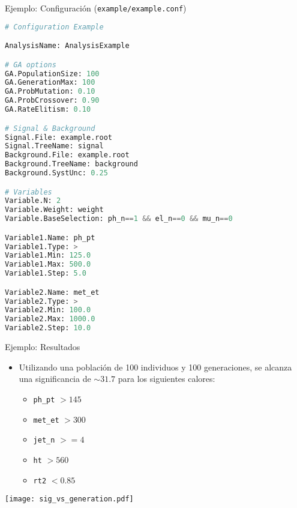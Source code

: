 \documentclass[center,10pt,cm]{beamer}
\begin{document}
\begin{frame}[fragile]{Ejemplo: Configuraci\'on (\texttt{example/example.conf})}

  \tiny
  \begin{lstlisting}[language=python]
# Configuration Example

AnalysisName: AnalysisExample

# GA options
GA.PopulationSize: 100
GA.GenerationMax: 100
GA.ProbMutation: 0.10
GA.ProbCrossover: 0.90
GA.RateElitism: 0.10

# Signal & Background
Signal.File: example.root
Signal.TreeName: signal
Background.File: example.root
Background.TreeName: background
Background.SystUnc: 0.25

# Variables
Variable.N: 2
Variable.Weight: weight
Variable.BaseSelection: ph_n==1 && el_n==0 && mu_n==0

Variable1.Name: ph_pt
Variable1.Type: >
Variable1.Min: 125.0
Variable1.Max: 500.0
Variable1.Step: 5.0

Variable2.Name: met_et
Variable2.Type: >
Variable2.Min: 100.0
Variable2.Max: 1000.0
Variable2.Step: 10.0
  \end{lstlisting}

\end{frame}

\begin{frame}{Ejemplo: Resultados}

  \begin{itemize}\itemsep0.2cm\parskip0.2cm
  \item Utilizando una poblaci\'on de 100 individuos y 100 generaciones, se alcanza una significancia de
    $\sim 31.7$ para los siguientes calores:

    \begin{itemize}
    \item \texttt{ph\_pt} $> 145$
    \item \texttt{met\_et} $> 300$
    \item \texttt{jet\_n} $>= 4$
    \item \texttt{ht} $> 560$
    \item \texttt{rt2} $< 0.85$
    \end{itemize}

  \end{itemize}

  \texttt{[image: sig\_vs\_generation.pdf]}

\end{frame}
\end{document}
